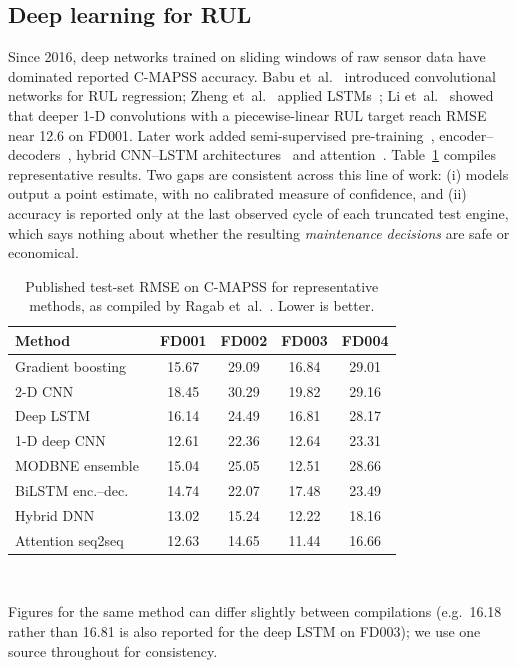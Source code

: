 \subsection{Deep learning for RUL}
Since 2016, deep networks trained on sliding windows of raw sensor data have
dominated reported C-MAPSS accuracy. Babu et~al.~\cite{babu2016cnn} introduced
convolutional networks for RUL regression; Zheng et~al.~\cite{zheng2017lstm}
applied LSTMs~\cite{hochreiter1997lstm}; Li et~al.~\cite{li2018dcnn} showed
that deeper 1-D convolutions with a piecewise-linear RUL target reach RMSE near
12.6 on FD001. Later work added semi-supervised pre-training~\cite{listou2019semisup},
encoder--decoders~\cite{yu2019bilstmed}, hybrid CNN--LSTM
architectures~\cite{aldulaimi2019hdnn} and attention~\cite{ragab2020ats2s}.
Table~\ref{tab:literature} compiles representative results. Two gaps are
consistent across this line of work: (i) models output a point estimate,
with no calibrated measure of confidence, and (ii) accuracy is reported only at
the last observed cycle of each truncated test engine, which says nothing about
whether the resulting \emph{maintenance decisions} are safe or economical.
\begin{table}[t]
\centering
\caption{Published test-set RMSE on C-MAPSS for representative methods, as
compiled by Ragab et~al.~\cite{ragab2020ats2s}. Lower is better.}
\label{tab:literature}
\setlength{\tabcolsep}{4pt}
\begin{tabular}{@{}lcccc@{}}
\toprule
Method & FD001 & FD002 & FD003 & FD004 \\
\midrule
Gradient boosting~\cite{zhang2016modbne}      & 15.67 & 29.09 & 16.84 & 29.01 \\
2-D CNN~\cite{babu2016cnn}                   & 18.45 & 30.29 & 19.82 & 29.16 \\
Deep LSTM~\cite{zheng2017lstm}               & 16.14 & 24.49 & 16.81 & 28.17 \\
1-D deep CNN~\cite{li2018dcnn}               & 12.61 & 22.36 & 12.64 & 23.31 \\
MODBNE ensemble~\cite{zhang2016modbne}       & 15.04 & 25.05 & 12.51 & 28.66 \\
BiLSTM enc.--dec.~\cite{yu2019bilstmed}      & 14.74 & 22.07 & 17.48 & 23.49 \\
Hybrid DNN~\cite{aldulaimi2019hdnn}          & 13.02 & 15.24 & 12.22 & 18.16 \\
Attention seq2seq~\cite{ragab2020ats2s}      & 12.63 & 14.65 & 11.44 & 16.66 \\
\bottomrule
\end{tabular}
\\[2pt]
\parbox{\columnwidth}{\footnotesize Figures for the same method can differ
slightly between compilations (e.g.\ 16.18 rather than 16.81 is also reported
for the deep LSTM on FD003); we use one source throughout for consistency.}
\end{table}

